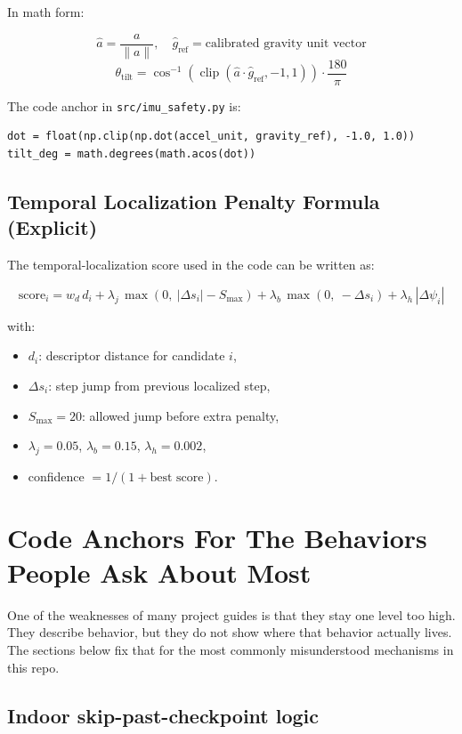 \documentclass[11pt]{article}
\begin{document}
In math form:

\[
\hat{a} = \frac{a}{\|a\|},\quad
\hat{g}_{\text{ref}} = \text{calibrated gravity unit vector}
\]
\[
\theta_{\text{tilt}} = \cos^{-1}\!\left(\operatorname{clip}\left(\hat{a}\cdot\hat{g}_{\text{ref}}, -1, 1\right)\right)\cdot\frac{180}{\pi}
\]

The code anchor in \texttt{src/imu\_safety.py} is:

\begin{lstlisting}
dot = float(np.clip(np.dot(accel_unit, gravity_ref), -1.0, 1.0))
tilt_deg = math.degrees(math.acos(dot))
\end{lstlisting}

\subsection{Temporal Localization Penalty Formula (Explicit)}

The temporal-localization score used in the code can be written as:

\[
\text{score}_i
=
w_d\,d_i
 + \lambda_j\,\max(0,\ |\Delta s_i| - S_{\max})
 + \lambda_b\,\max(0,\ -\Delta s_i)
 + \lambda_h\,|\Delta \psi_i|
\]

with:

\begin{itemize}[nosep]
  \item \(d_i\): descriptor distance for candidate \(i\),
  \item \(\Delta s_i\): step jump from previous localized step,
  \item \(S_{\max} = 20\): allowed jump before extra penalty,
  \item \(\lambda_j = 0.05\), \(\lambda_b = 0.15\), \(\lambda_h = 0.002\),
  \item confidence \(= 1/(1+\text{best score})\).
\end{itemize}

\section{Code Anchors For The Behaviors People Ask About Most}

One of the weaknesses of many project guides is that they stay one level too high.
They describe behavior, but they do not show where that behavior actually lives. The
sections below fix that for the most commonly misunderstood mechanisms in this repo.

\subsection{Indoor skip-past-checkpoint logic}
\end{document}
